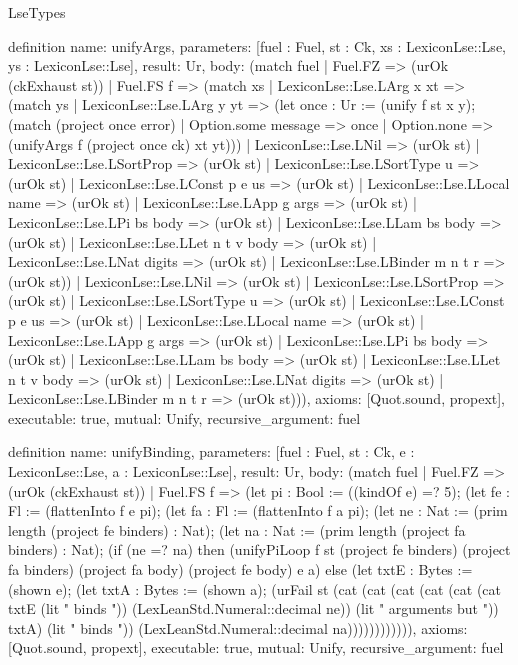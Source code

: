 \begin{lexlean}{LseTypes}
\begin{semanticmodule}
definition{
  name: unifyArgs,
  parameters: [fuel : Fuel, st : Ck, xs : LexiconLse::Lse, ys : LexiconLse::Lse],
  result: Ur,
  body: (match fuel
    | Fuel.FZ => (urOk (ckExhaust st))
    | Fuel.FS f => (match xs
      | LexiconLse::Lse.LArg x xt => (match ys
        | LexiconLse::Lse.LArg y yt => (let once : Ur := (unify f st x y); (match (project once error)
          | Option.some message => once
          | Option.none => (unifyArgs f (project once ck) xt yt)))
        | LexiconLse::Lse.LNil => (urOk st)
        | LexiconLse::Lse.LSortProp => (urOk st)
        | LexiconLse::Lse.LSortType u => (urOk st)
        | LexiconLse::Lse.LConst p e us => (urOk st)
        | LexiconLse::Lse.LLocal name => (urOk st)
        | LexiconLse::Lse.LApp g args => (urOk st)
        | LexiconLse::Lse.LPi bs body => (urOk st)
        | LexiconLse::Lse.LLam bs body => (urOk st)
        | LexiconLse::Lse.LLet n t v body => (urOk st)
        | LexiconLse::Lse.LNat digits => (urOk st)
        | LexiconLse::Lse.LBinder m n t r => (urOk st))
      | LexiconLse::Lse.LNil => (urOk st)
      | LexiconLse::Lse.LSortProp => (urOk st)
      | LexiconLse::Lse.LSortType u => (urOk st)
      | LexiconLse::Lse.LConst p e us => (urOk st)
      | LexiconLse::Lse.LLocal name => (urOk st)
      | LexiconLse::Lse.LApp g args => (urOk st)
      | LexiconLse::Lse.LPi bs body => (urOk st)
      | LexiconLse::Lse.LLam bs body => (urOk st)
      | LexiconLse::Lse.LLet n t v body => (urOk st)
      | LexiconLse::Lse.LNat digits => (urOk st)
      | LexiconLse::Lse.LBinder m n t r => (urOk st))),
  axioms: [Quot.sound, propext],
  executable: true,
  mutual: Unify,
  recursive_argument: fuel
}

definition{
  name: unifyBinding,
  parameters: [fuel : Fuel, st : Ck, e : LexiconLse::Lse, a : LexiconLse::Lse],
  result: Ur,
  body: (match fuel
    | Fuel.FZ => (urOk (ckExhaust st))
    | Fuel.FS f => (let pi : Bool := ((kindOf e) =? 5); (let fe : Fl := (flattenInto f e pi); (let fa : Fl := (flattenInto f a pi); (let ne : Nat := (prim length (project fe binders) : Nat); (let na : Nat := (prim length (project fa binders) : Nat); (if (ne =? na) then (unifyPiLoop f st (project fe binders) (project fa binders) (project fa body) (project fe body) e a) else (let txtE : Bytes := (shown e); (let txtA : Bytes := (shown a); (urFail st (cat (cat (cat (cat (cat (cat txtE (lit " binds ")) (LexLeanStd.Numeral::decimal ne)) (lit " arguments but ")) txtA) (lit " binds ")) (LexLeanStd.Numeral::decimal na)))))))))))),
  axioms: [Quot.sound, propext],
  executable: true,
  mutual: Unify,
  recursive_argument: fuel
}


\end{semanticmodule}
\end{lexlean}
